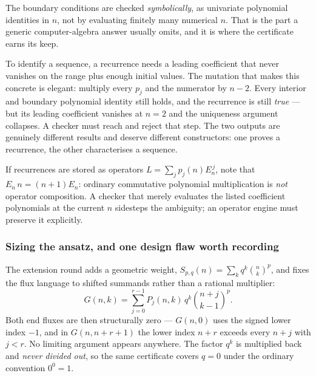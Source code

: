 The boundary conditions are checked \emph{symbolically}, as univariate
polynomial identities in $n$, not by evaluating finitely many numerical $n$.
That is the part a generic computer-algebra answer usually omits, and it is
where the certificate earns its keep.

\begin{remark}
To identify a sequence, a recurrence needs a leading coefficient that never
vanishes on the range plus enough initial values. The mutation that makes this
concrete is elegant: multiply every $p_j$ and the numerator by $n-2$. Every
interior and boundary polynomial identity still holds, and the recurrence is
still \emph{true} --- but its leading coefficient vanishes at $n=2$ and the
uniqueness argument collapses. A checker must reach and reject that step. The
two outputs are genuinely different results and deserve different constructors:
one proves a recurrence, the other characterises a sequence.
\end{remark}

\begin{remark}
If recurrences are stored as operators $L=\sum_j p_j(n)E_n^{\,j}$, note that
$E_n\,n=(n+1)E_n$: ordinary commutative polynomial multiplication is \emph{not}
operator composition. A checker that merely evaluates the listed coefficient
polynomials at the current $n$ sidesteps the ambiguity; an operator engine must
preserve it explicitly.
\end{remark}

\subsubsection*{Sizing the ansatz, and one design flaw worth recording}

The extension round adds a geometric weight, $S_{p,q}(n)=\sum_k q^k\binom nk^p$,
and fixes the flux language to shifted summands rather than a rational
multiplier:
\[
 G(n,k)=\sum_{j=0}^{r-1}P_j(n,k)\,q^k\binom{n+j}{k-1}^{p}.
\]
Both end fluxes are then structurally zero --- $G(n,0)$ uses the signed lower
index $-1$, and in $G(n,n+r+1)$ the lower index $n+r$ exceeds every $n+j$ with
$j<r$. No limiting argument appears anywhere. The factor $q^k$ is multiplied
back and \emph{never divided out}, so the same certificate covers $q=0$ under
the ordinary convention $0^0=1$.

